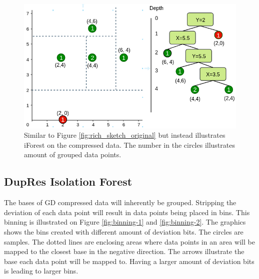 \begin{figure}
  \centering
  \includegraphics[width=\linewidth]{images/rich_sketch_bases.png}
  \caption{Similar to Figure \ref{fig:rich_sketch_original} but instead illustrates iForest on the compressed data. The number in the circles illustrates amount of grouped data points.}
  \label{fig:rich_sketch_bases}
\end{figure}


\subsection{DupRes Isolation Forest}
The bases of GD compressed data will inherently be grouped. Stripping the deviation of each data point will result in data points being placed in bins. This binning is illustrated on Figure \ref{fig:binning-1} and \ref{fig:binning-2}. The graphics shows the bins created with different amount of deviation bits. The circles are samples. The dotted lines are enclosing areas where data points in an area will be mapped to the closest base in the negative direction. The arrows illustrate the base each data point will be mapped to. Having a larger amount of deviation bits is leading to larger bins.

